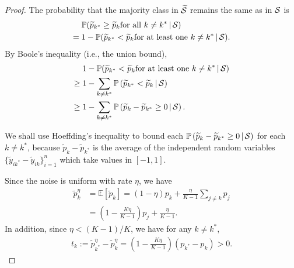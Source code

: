 \documentclass[letterpaper]{article} %
\newcommand{\Em}{{\mathbb{E}}}
\newcommand{\Pm}{{\mathbb{P}}}
\newcommand{\gvn}{\,|\,}
\newcommand{\cS}{{\cal{S}}}
\begin{document}
\begin{proof}
    
    The probability that the majority class in $\widetilde{\cS}$ remains the same as in $\cS$ is
    \begin{align*}
        &\; \Pm
        (
        \widetilde{p}_{k^*}\geq\widetilde{p}_{k}
        \text{for all $k\ne k^*$}
        \gvn \cS
        ) 
        \\
        =&\; 1-\Pm
        (
        \widetilde{p}_{k^*} < \widetilde{p}_{k}
        \text{for at least one $k\ne k^*$}
        \gvn \cS
        ). 
    \end{align*}
    By Boole's inequality (i.e., the union bound),
    \begin{align}
        &\; 1-\Pm
        (
        \widetilde{p}_{k^*} < \widetilde{p}_{k}
        \text{for at least one $k\ne k^*$}
        \gvn \cS
        ) \nonumber
        \\
        \geq&\; 1 - \sum_{k\ne k^*} \Pm\left( \widetilde{p}_{k^*} < \widetilde{p}_{k} 
        \gvn \cS
        \right) \nonumber
        \\
        \geq&\; 1 - \sum_{k\ne k^*} \Pm\left( \widetilde{p}_{k} - \widetilde{p}_{k^*} \geq 0  
        \gvn 
        \cS
        \right).\label{eq:booles}
    \end{align}

    We shall use Hoeffding's inequality to bound each 
    $\Pm\left( \widetilde{p}_{k} - \widetilde{p}_{k^*} \geq 0  
        \gvn 
        \cS
        \right)$ for each $k \neq k^{*}$, because
    $\widetilde{p}_{k} - \widetilde{p}_{k^*}$ is the average of the 
    independent random variables
    $\{\widetilde{y}_{ik^*} - \widetilde{y}_{ik}\}_{i=1}^n$
    which take values in $[-1, 1]$.
        
    Since the noise is uniform with rate $\eta$, we have
    \begin{align*}
        \widetilde{p}_{k}^{\eta} 
        &= \Em[\widetilde{p}_{k}] 
        = (1-\eta) p_{k} + \frac{\eta}{K-1} \sum_{j \neq k} p_{j} \\
        &= \left(1 - \frac{K\eta}{K-1}\right)p_{j} + \frac{\eta}{K-1}.
    \end{align*}
    In addition, since $\eta < (K-1)/K$, we have for any $k \neq k^{*}$,
    \begin{align*}
        t_{k} := \widetilde{p}_{k^{*}}^{\eta} - \widetilde{p}_{k}^{\eta}
        = \left(1 - \frac{K\eta}{K-1}\right)(p_{k^{*}} - p_{k}) 
        > 0.
    \end{align*}


\end{proof}
\end{document}

